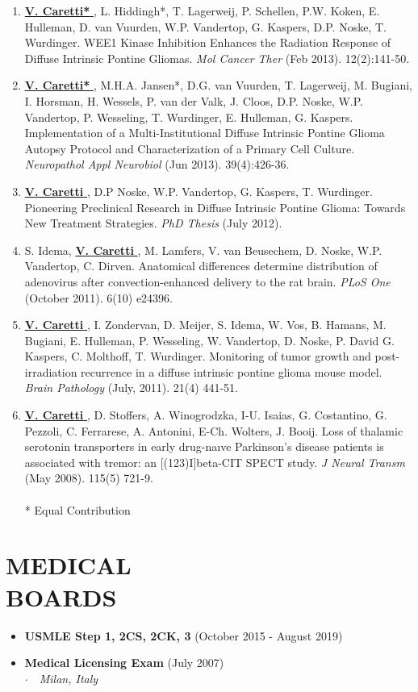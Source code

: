 \documentclass[line,margin]{res}
\newcommand{\namestyle}[1]{\underline{\bf #1 }}
\newcommand{\titlestyle}[1]{{\bf #1}}
\newcommand{\placestyle}[1]{\footnotesize $\cdot$\ \ {\emph{#1}}}
\newcommand{\datestyle}[1]{{\tiny \dotfill} {\small (#1)}}
\begin{document}
\begin{resume}
{\begin{enumerate}
\item \namestyle{V. Caretti*}, L. Hiddingh*, T. Lagerweij, P. Schellen, P.W. Koken, E. Hulleman, D. van Vuurden, W.P. Vandertop, G. Kaspers, D.P. Noske, T. Wurdinger. WEE1 Kinase Inhibition Enhances the Radiation Response of Diffuse Intrinsic Pontine Gliomas. \emph{Mol Cancer Ther} (Feb 2013). 12(2):141-50.
\item \namestyle{V. Caretti*}, M.H.A. Jansen*, D.G. van Vuurden, T. Lagerweij, M. Bugiani, I. Horsman, H. Wessels, P. van der Valk, J. Cloos, D.P. Noske, W.P. Vandertop, P. Wesseling, T. Wurdinger, E. Hulleman, G. Kaspers. Implementation of a Multi-Institutional Diffuse Intrinsic Pontine Glioma Autopsy Protocol and Characterization of a Primary Cell Culture. \emph{Neuropathol Appl Neurobiol} (Jun 2013). 39(4):426-36.
\item \namestyle{V. Caretti}, D.P Noske, W.P. Vandertop, G. Kaspers, T. Wurdinger. Pioneering Preclinical Research in Diffuse Intrinsic Pontine Glioma: Towards New Treatment Strategies. \emph{PhD Thesis} (July 2012).
\item S. Idema, \namestyle{V. Caretti}, M. Lamfers, V. van Beusechem, D. Noske, W.P. Vandertop, C. Dirven. Anatomical differences determine distribution of adenovirus after convection-enhanced delivery to the rat brain. \emph{PLoS One} (October 2011). 6(10) e24396.
\item \namestyle{V. Caretti}, I. Zondervan, D. Meijer, S. Idema, W. Vos, B. Hamans, M. Bugiani, E. Hulleman, P. Wesseling, W. Vandertop, D. Noske, P. David G. Kaspers, C. Molthoff, T. Wurdinger. Monitoring of tumor growth and post-irradiation recurrence in a diffuse intrinsic pontine glioma mouse model. \emph{Brain Pathology} (July, 2011). 21(4) 441-51.
\item \namestyle{V. Caretti}, D. Stoffers, A. Winogrodzka, I-U. Isaias, G. Costantino, G. Pezzoli, C. Ferrarese, A. Antonini, E-Ch. Wolters, J. Booij. Loss of thalamic serotonin transporters in early drug-naıve Parkinson’s disease patients is associated with tremor: an [(123)I]beta-CIT SPECT study. \emph{J Neural Transm} (May 2008). 115(5) 721-9.
  \\ \\ {* Equal Contribution}
\end{enumerate}
}

\section{MEDICAL \\ BOARDS}
\begin{itemize}
\item {
  \titlestyle {USMLE Step 1, 2CS, 2CK, 3} \datestyle{October 2015 - August 2019}
}
\item {
  \titlestyle {Medical Licensing Exam} \datestyle{July 2007} \\
  { \placestyle{Milan, Italy} }
}
\end{itemize}


\end{resume}
\end{document}
